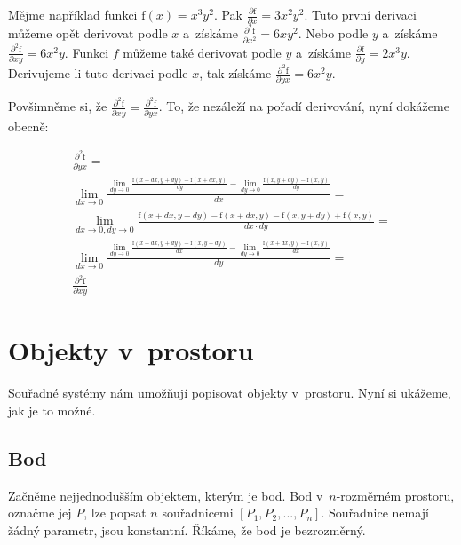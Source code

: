 Mějme například funkci \(\mathrm{f}(x) = x^3 y^2\). Pak \(\frac{\partial \mathrm{f}}{\partial x} = 3 x^2 y^2\). Tuto první derivaci můžeme opět derivovat podle \(x\) a~získáme \(\frac{\partial^2 \mathrm{f}}{\partial x^2} = 6 x y^2\). Nebo podle \(y\) a~získáme \(\frac{\partial^2 \mathrm{f}}{\partial xy} = 6 x^2 y\).
Funkci \(f\) můžeme také derivovat podle \(y\) a~získáme \(\frac{\partial \mathrm{f}}{\partial y} = 2 x^3 y\). Derivujeme-li tuto derivaci podle \(x\), tak získáme \(\frac{\partial^2 \mathrm{f}}{\partial yx} = 6 x^2 y\).

Povšimněme si, že \(\frac{\partial^2 \mathrm{f}}{\partial xy} = \frac{\partial^2 \mathrm{f}}{\partial yx}\). To, že nezáleží na pořadí derivování, nyní dokážeme obecně:

\begin{equation}
\begin{split}
\frac{\partial^2 \mathrm{f}}{\partial yx} = \\
\lim_{dx \to 0} \frac{\lim_{dy \to 0} \frac{\mathrm{f}(x+dx, y+dy) - \mathrm{f}(x+dx, y)}{dy} - \lim_{dy \to 0} \frac{\mathrm{f}(x, y+dy) - \mathrm{f}(x, y)}{dy}}{dx} = \\
\lim_{dx \to 0, dy \to 0} \frac{\mathrm{f}(x+dx, y+dy) - \mathrm{f}(x+dx, y) - \mathrm{f}(x, y+dy) + \mathrm{f}(x, y)}{dx \cdot dy} = \\
\lim_{dx \to 0} \frac{\lim_{dy \to 0} \frac{\mathrm{f}(x+dx, y+dy) - \mathrm{f}(x, y+dy)}{dx} - \lim_{dy \to 0} \frac{\mathrm{f}(x+dx, y) - \mathrm{f}(x, y)}{dx}}{dy} = \\
\frac{\partial^2 \mathrm{f}}{\partial xy}
\end{split}
\end{equation}


\section{Objekty v~prostoru}

Souřadné systémy nám umožňují popisovat objekty v~prostoru. Nyní si ukážeme, jak je to možné.

\subsection{Bod}

Začněme nejjednodušším objektem, kterým je bod. Bod v~\(n\)-rozměrném prostoru, označme jej \(P\), lze popsat \(n\) souřadnicemi \([P_1, P_2, ..., P_n]\). Souřadnice nemají žádný parametr, jsou konstantní. Říkáme, že bod je bezrozměrný.


